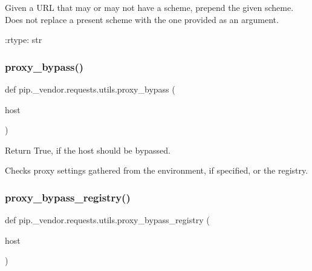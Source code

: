 \begin{DoxyVerb}Given a URL that may or may not have a scheme, prepend the given scheme.
Does not replace a present scheme with the one provided as an argument.

:rtype: str
\end{DoxyVerb}
 \mbox{\label{namespacepip_1_1__vendor_1_1requests_1_1utils_ae931cb674d7a3a3929f41f054ab25c8a}} 
\subsubsection{\texorpdfstring{proxy\+\_\+bypass()}{proxy\_bypass()}}
{\footnotesize\ttfamily def pip.\+\_\+vendor.\+requests.\+utils.\+proxy\+\_\+bypass (\begin{DoxyParamCaption}\item[{}]{host }\end{DoxyParamCaption})}

\begin{DoxyVerb}Return True, if the host should be bypassed.

Checks proxy settings gathered from the environment, if specified,
or the registry.
\end{DoxyVerb}
 \mbox{\label{namespacepip_1_1__vendor_1_1requests_1_1utils_ae01a288e9e64d3a6341b9b07cc06d3ee}} 
\subsubsection{\texorpdfstring{proxy\+\_\+bypass\+\_\+registry()}{proxy\_bypass\_registry()}}
{\footnotesize\ttfamily def pip.\+\_\+vendor.\+requests.\+utils.\+proxy\+\_\+bypass\+\_\+registry (\begin{DoxyParamCaption}\item[{}]{host }\end{DoxyParamCaption})}

